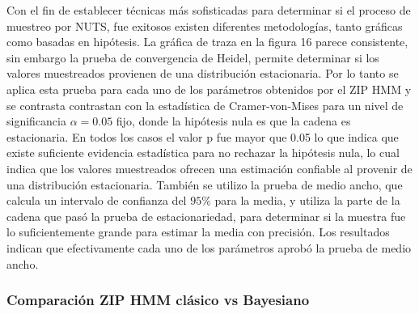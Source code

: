 \documentclass[a4paper]{article}\usepackage[]{graphicx}\usepackage[]{color}
\begin{document}
Con el fin de establecer técnicas más sofisticadas para determinar si el proceso de muestreo por NUTS, fue exitosos existen diferentes metodologías, tanto gráficas como basadas en hipótesis. La gráfica de traza en la figura 16 parece consistente, sin embargo la prueba de convergencia de Heidel, permite determinar si los valores muestreados provienen de una distribución estacionaria. Por lo tanto se aplica esta prueba para cada uno de los parámetros obtenidos por el ZIP HMM y se contrasta contrastan con la estadística de Cramer-von-Mises para un nivel de significancia $\alpha = 0.05$ fijo, donde la hipótesis nula es que la cadena es estacionaria. En todos los casos el valor p fue mayor que 0.05 lo que indica que existe suficiente evidencia estadística para no rechazar la hipótesis nula, lo cual indica que los valores muestreados ofrecen una estimación confiable al provenir de una distribución estacionaria. 
También se utilizo la prueba de medio ancho, que calcula un intervalo de confianza del $95 \%$ para la media, y utiliza la parte de la cadena que pasó la prueba de estacionariedad, para determinar si la muestra fue lo suficientemente grande para estimar la media con precisión. Los resultados indican que efectivamente cada uno de los parámetros aprobó la prueba de medio ancho.

\clearpage

\subsubsection{Comparación ZIP HMM clásico vs Bayesiano}
\end{document}
